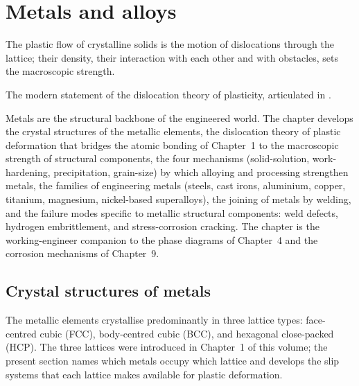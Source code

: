 \chapter{Metals and alloys}
\label{vol05:ch05}

\epigraph{The plastic flow of crystalline solids is the motion of
dislocations through the lattice; their density, their interaction with
each other and with obstacles, sets the macroscopic strength.}{The
modern statement of the dislocation theory of plasticity, articulated
in \textcite[ch.~5]{text:dieter-mechanical-metallurgy}.}


\noindent
Metals are the structural backbone of the engineered world. The
chapter develops the crystal structures of the metallic elements, the
dislocation theory of plastic deformation that bridges the atomic
bonding of Chapter~1 to the macroscopic strength of structural
components, the four mechanisms (solid-solution, work-hardening,
precipitation, grain-size) by which alloying and processing strengthen
metals, the families of engineering metals (steels, cast irons,
aluminium, copper, titanium, magnesium, nickel-based superalloys),
the joining of metals by welding, and the failure modes specific to
metallic structural components: weld defects, hydrogen embrittlement,
and stress-corrosion cracking. The chapter is the working-engineer
companion to the phase diagrams of Chapter~4 and the corrosion
mechanisms of Chapter~9.

\section{Crystal structures of metals}

The metallic elements crystallise predominantly in three lattice
types: face-centred cubic (FCC), body-centred cubic (BCC), and
hexagonal close-packed (HCP). The three lattices were introduced in
Chapter~1 of this volume; the present section names which metals
occupy which lattice and develops the slip systems that each lattice
makes available for plastic deformation.

